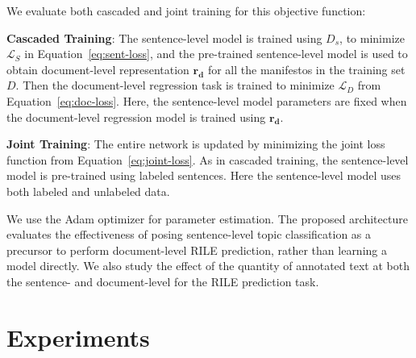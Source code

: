 \documentclass[11pt,a4paper]{article}
\newcommand{\eqnref}[2][]{Equation#1~\ref{#2}\xspace}
\begin{document}
We evaluate both cascaded and joint training for this objective function:
\begin{description}
\item{\textbf{Cascaded Training}:} The sentence-level model is trained using $D_{s}$, to minimize $\mathcal{L}_S$ in \eqnref{eq:sent-loss}, and the pre-trained sentence-level model is used to obtain document-level representation $\mathbf{r_{d}}$ for all the manifestos in the training set $D$. Then the document-level regression task is trained to minimize $\mathcal{L}_D$ from \eqnref{eq:doc-loss}. Here, the sentence-level model parameters are fixed when the document-level regression model is trained using $\mathbf{r_{d}}$.

\item{\textbf{Joint Training}:} The entire network is updated by minimizing the joint loss function from \eqnref{eq:joint-loss}. As in cascaded training, the sentence-level model is pre-trained using labeled sentences. Here the sentence-level model uses both labeled and unlabeled data.
\end{description}

We use the Adam optimizer \cite{DBLP:journals/corr/KingmaB14} for parameter estimation. The proposed architecture evaluates the effectiveness of posing sentence-level topic classification as a precursor to perform document-level RILE prediction, rather than learning a model directly.  We also study the effect of the quantity of annotated text at both the sentence- and document-level for the RILE prediction task. 



\section{Experiments}
\end{document}
